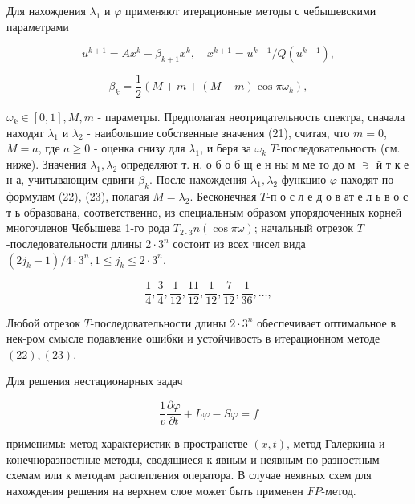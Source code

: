 \documentclass[10pt]{article}
\begin{document}
Для нахождения $\lambda_{1}$ и $\varphi$ применяют итерационные методы с чебышевскими параметрами



\[

u^{k+1}=A x^{k}-\beta_{k+1} x^{k}, \quad x^{k+1}=u^{k+1} / Q\left(u^{k+1}\right),

\]



\[

\beta_{k}=\frac{1}{2}\left(M+m+(M-m) \cos \pi \omega_{k}\right),

\]



$\omega_{k} \in[0,1], M, m$ - параметры. Предполагая неотрицательность спектра, сначала находят $\lambda_{1}$ и $\lambda_{2}$ - наибольшие собственные значения (21), считая, что $m=0$, $M=a$, где $a \geqslant 0$ - оценка снизу для $\lambda_{1}$, и беря за $\omega_{k}$ $T$-последовательность (см. ниже). Значения $\lambda_{1}, \lambda_{2}$ определяют т. н. о б о б щ е н ны м ме то до м $\ni$ й т к е н а, учитывающим сдвиги $\beta_{k}$. После нахождения $\lambda_{1}, \lambda_{2}$ функцию $\varphi$ находят по формулам (22), (23), полагая $M=\lambda_{2}$. Бесконечная $T$-п о с л е д о в ат е л ь в о с т ь образована, соответственно, из специальным образом упорядоченных корней многочленов Чебышева 1-го рода $T_{2 \cdot 3} n(\cos \pi \omega)$; начальный отрезок $T$-последовательности длины $2 \cdot 3^{n}$ состоит из всех чисел вида $\left(2 j_{k}-1\right) / 4 \cdot 3^{n}, 1 \leqslant j_{k} \leqslant 2 \cdot 3^{n}$,



\[

\frac{1}{4}, \frac{3}{4}, \frac{1}{12}, \frac{11}{12}, \frac{1}{12}, \frac{7}{12}, \frac{1}{36}, \ldots,

\]



Любой отрезок $T$-последовательности длины $2 \cdot 3^{n}$ обеспечивает оптимальное в нек-ром смысле подавление ошибки и устойчивость в итерационном методе $(22),(23)$.



Для решения нестационарных задач



\[

\frac{1}{v} \frac{\partial \varphi}{\partial t}+L \varphi-S \varphi=f

\]



применимы: метод характеристик в пространстве $(x, t)$, метод Галеркина и конечноразностные методы, сводящиеся к явным и неявным по разностным схемам или к методам распепления оператора. В случае неявных схем для нахождения решения на верхнем слое может быть применен $F P$-метод.
\end{document}
